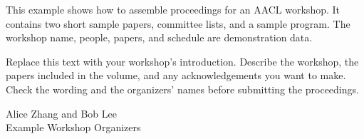 This example shows how to assemble proceedings for an AACL workshop.
It contains two short sample papers, committee lists, and a sample program.
The workshop name, people, papers, and schedule are demonstration data.

Replace this text with your workshop's introduction. Describe the workshop,
the papers included in the volume, and any acknowledgements you want to make.
Check the wording and the organizers' names before submitting the proceedings.

\bigskip
\noindent Alice Zhang and Bob Lee\\
Example Workshop Organizers
